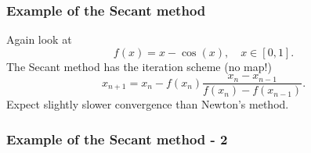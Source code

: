 \documentclass{beamer}
\begin{document}
\begin{frame}
  \frametitle{Example of the Secant method}

  Again look at
  \begin{equation*}
    f(x) = x - \cos(x), \quad x \in [0, 1].
  \end{equation*}
  The Secant method has the iteration scheme (no map!)
  \begin{equation*}
    x_{n+1}  = x_n - f(x_n) \frac{x_n - x_{n-1}}{f(x_n) - f(x_{n-1})}.
  \end{equation*}
  Expect slightly slower convergence than Newton's method.

\end{frame}

\begin{frame}
  \frametitle{Example of the Secant method - 2}


\end{frame}
\end{document}
